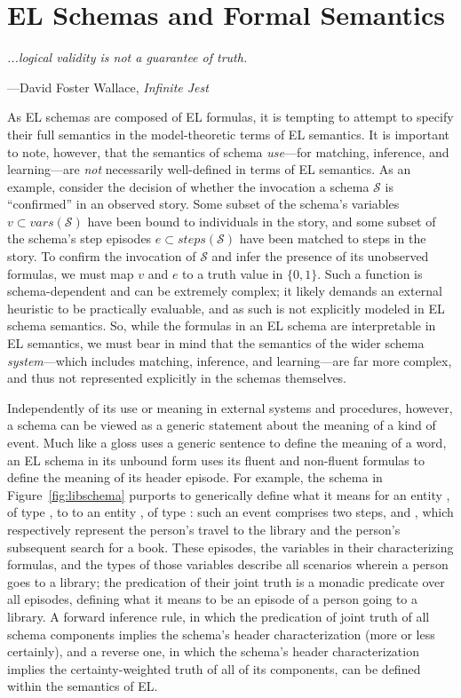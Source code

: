 \section{EL Schemas and Formal Semantics}
\label{sec:formal_semantics}

\epigraph{\textit{...logical validity is not a guarantee of truth.}}{---David Foster Wallace, \textit{Infinite Jest}}

As EL schemas are composed of EL formulas, it is tempting to attempt to specify their full semantics in the model-theoretic terms of EL semantics. It is important to note, however, that the semantics of schema \textit{use}---for matching, inference, and learning---are \textit{not} necessarily well-defined in terms of EL semantics. As an example, consider the decision of whether the invocation a schema $\mathcal{S}$ is ``confirmed'' in an observed story. Some subset of the schema's variables $v \subset vars(\mathcal{S})$ have been bound to individuals in the story, and some subset of the schema's step episodes $e \subset steps(\mathcal{S})$ have been matched to steps in the story. To confirm the invocation of $\mathcal{S}$ and infer the presence of its unobserved formulas, we must map $v$ and $e$ to a truth value in $\{0, 1\}$. Such a function is schema-dependent and can be extremely complex; it likely demands an external heuristic to be practically evaluable, and as such is not explicitly modeled in EL schema semantics. So, while the formulas in an EL schema are interpretable in EL semantics, we must bear in mind that the semantics of the wider schema \textit{system}---which includes matching, inference, and learning---are far more complex, and thus not represented explicitly in the schemas themselves.

Independently of its use or meaning in external systems and procedures, however, a schema can be viewed as a generic statement about the meaning of a kind of event. Much like a gloss uses a generic sentence to define the meaning of a word, an EL schema in its unbound form uses its fluent and non-fluent formulas to define the meaning of its header episode. For example, the schema in Figure~\ref{fig:libschema} purports to generically define what it means for an entity , of type , to  to an entity , of type : such an event comprises two steps,  and , which respectively represent the person's travel to the library and the person's subsequent search for a book. These episodes, the variables in their characterizing formulas, and the types of those variables describe all scenarios  wherein a person goes to a library; the predication of their joint truth is a monadic predicate over all episodes, defining what it means to be an episode of a person going to a library. A forward inference rule, in which the predication of joint truth of all schema components implies the schema's header characterization (more or less certainly), and a reverse one, in which the schema's header characterization implies the certainty-weighted truth of all of its components, can be defined within the semantics of EL.

